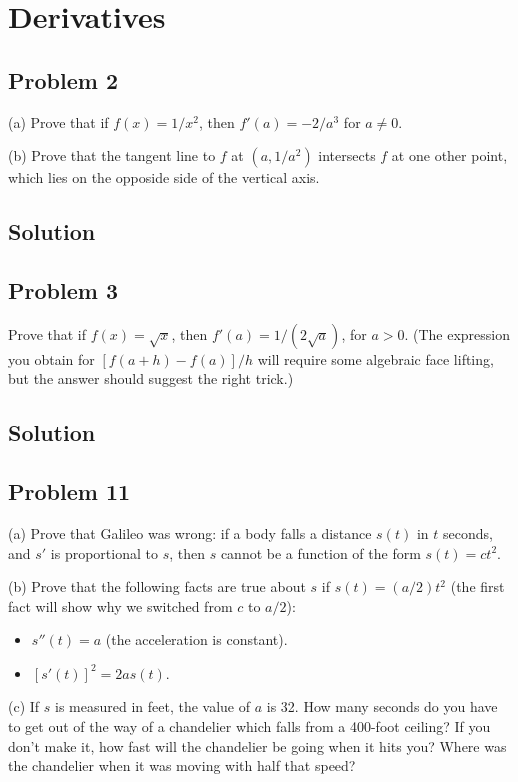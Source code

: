 \section{Derivatives}

\subsection*{Problem 2}
(a) Prove that if $f(x)=1/x^2$, then $f'(a)=-2/a^3$ for $a\neq0$.

(b) Prove that the tangent line to $f$ at $(a, 1/a^2)$ intersects $f$
at one other point, which lies on the opposide side of the vertical
axis.

\subsection*{Solution}

\subsection*{Problem 3}
Prove that if $f(x)=\sqrt{x}$, then $f'(a)=1/(2\sqrt{a})$, for $a>0$.
(The expression you obtain for $[f(a+h)-f(a)]/h$ will require some
algebraic face lifting, but the answer should suggest the right
trick.)

\subsection*{Solution}

\subsection*{Problem 11}
(a) Prove that Galileo was wrong: if a body falls a distance $s(t)$ in
$t$ seconds, and $s'$ is proportional to $s$, then $s$ cannot be a
function of the form $s(t)=ct^2$.

\vs

(b) Prove that the following facts are true about $s$ if
$s(t)=(a/2)t^2$ (the first fact will show why we switched from $c$ to
$a/2$):
\begin{itemize}
\item $s''(t)=a$ (the acceleration is constant).
\item $[s'(t)]^2=2as(t)$.
\end{itemize}

(c) If $s$ is measured in feet, the value of $a$ is 32. How many
seconds do you have to get out of the way of a chandelier which falls
from a 400-foot ceiling? If you don't make it, how fast will the
chandelier be going when it hits you? Where was the chandelier when it
was moving with half that speed?

